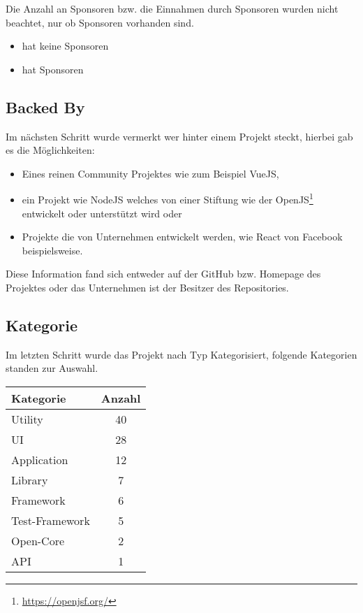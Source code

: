 Die Anzahl an Sponsoren bzw. die Einnahmen durch Sponsoren wurden nicht beachtet, nur ob Sponsoren
vorhanden sind.

\begin{itemize}[noitemsep]
    \item[0 =] hat keine Sponsoren
    \item[1 =] hat Sponsoren
\end{itemize}


\subsection{Backed By}
Im nächsten Schritt wurde vermerkt wer hinter einem Projekt steckt, hierbei gab es die Möglichkeiten:

\begin{itemize}[noitemsep]
    \item[0 =] Eines reinen Community Projektes wie zum Beispiel VueJS,
    \item[1 =] ein Projekt wie NodeJS welches von einer Stiftung wie der OpenJS\footnote{\url{https://openjsf.org/}}
        entwickelt oder unterstützt wird oder
    \item[2 =] Projekte die von Unternehmen entwickelt werden, wie React von Facebook beispielsweise.
\end{itemize}

Diese Information fand sich entweder auf der GitHub bzw. Homepage des Projektes oder das Unternehmen
ist der Besitzer des Repositories.

\subsection{Kategorie}
Im letzten Schritt wurde das Projekt nach Typ Kategorisiert, folgende Kategorien standen zur Auswahl.

\begin{table}[h]
    \begin{tabular}{ll}
        \hline
        \textbf{Kategorie} & \textbf{Anzahl}        \\ \hline
        Utility            & \multicolumn{1}{c}{40} \\
        UI                 & \multicolumn{1}{c}{28} \\
        Application        & \multicolumn{1}{c}{12} \\
        Library            & \multicolumn{1}{c}{7}  \\
        Framework          & \multicolumn{1}{c}{6}  \\
        Test-Framework     & \multicolumn{1}{c}{5}  \\
        Open-Core          & \multicolumn{1}{c}{2}  \\
        API                & \multicolumn{1}{c}{1}
    \end{tabular}%
\end{table}


